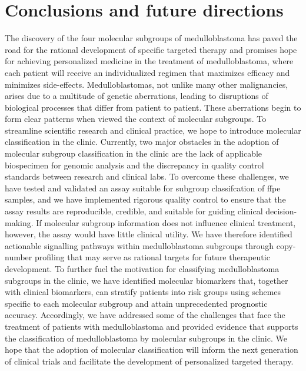 \chapter{Conclusions and future directions}
\label{ch:conclusion}

The discovery of the four molecular subgroups of medulloblastoma has paved the road for the rational development of specific targeted therapy and promises hope for achieving personalized medicine in the treatment of medulloblastoma, where each patient will receive an individualized regimen that maximizes efficacy and minimizes side-effects. Medulloblastomas, not unlike many other malignancies, arises due to a multitude of genetic aberrations, leading to disruptions of biological processes that differ from patient to patient. These aberrations begin to form clear patterns when viewed the context of molecular subgroups. To streamline scientific research and clinical practice, we hope to introduce molecular classification in the clinic. Currently, two major obstacles in the adoption of molecular subgroup classification in the clinic are the lack of applicable biospecimen for genomic analysis and the discrepancy in quality control standards between research and clinical labs. To overcome these challenges, we have tested and validated an assay suitable for subgroup classifcation of \gls{ffpe} samples, and we have implemented rigorous quality control to ensure that the assay results are reproducible, credible, and suitable for guiding clinical decision-making. If molecular subgroup information does not influence clinical treatment, however, the assay would have little clinical utility. We have therefore identified actionable signalling pathways within medulloblastoma subgroups through copy-number profiling that may serve as rational targets for future therapeutic development. To further fuel the motivation for classifying medulloblastoma subgroups in the clinic, we have identified molecular biomarkers that, together with clinical biomarkers, can stratify patients into risk groups using schemes specific to each molecular subgroup and attain unprecedented prognostic accuracy. Accordingly, we have addressed some of the challenges that face the treatment of patients with medulloblastoma and provided evidence that supports the classification of medulloblastoma by molecular subgroups in the clinic. We hope that the adoption of molecular classification will inform the next generation of clinical trials and facilitate the development of personalized targeted therapy.

